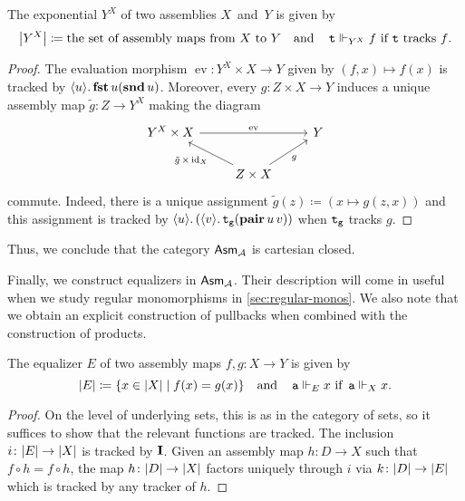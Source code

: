 \begin{proposition}[Exponentials]
  The exponential \(Y^X\) of two assemblies \(X\)~and~\(Y\) is given by
  \[
    \carrier*{Y^X} \coloneq
    \text{the set of assembly maps from \(X\) to \(Y\)}
    \quad\text{and}\quad
    \pca{t} \realizes_{Y^X} f
    \text{ if \(\pca{t}\) tracks \(f\)}.
  \]
\end{proposition}
\begin{proof}
  The evaluation morphism \(\operatorname{ev} \colon Y^X \times X \to Y\) given
  by \((f,x) \mapsto f(x)\) is tracked by
  \(\lambdapca{u}{\pcafst u(\pcasnd u)}\).
  Moreover, every \(g \colon Z \times X \to Y\) induces a unique assembly map
  \(\tilde g \colon Z \to Y^X\) making the diagram
  \[
    \begin{tikzcd}
      Y^X \times X \ar[rr,"\operatorname{ev}"]
      & & Y \\
      & Z \times X \ar[ur,"g"']
      \ar[ul,"{\tilde g} \,\times\, {\id_X}"]
    \end{tikzcd}
  \]
  commute.
  Indeed, there is a unique assignment
  \(\tilde g(z) \coloneq (x \mapsto g(z,x))\) and this assignment is tracked by
  \(\lambdapca{u}{(\lambdapca{v}{\pca{t_g}(\pcapair u\,v)})}\) when
  \(\pca{t_g}\) tracks \(g\).
\end{proof}

Thus, we conclude that the category \(\Asm{\AA}\) is cartesian closed.

Finally, we construct equalizers in \(\Asm{\AA}\). Their description will come
in useful when we study regular monomorphisms in \cref{sec:regular-monos}. We
also note that we obtain an explicit construction of pullbacks when combined
with the construction of products.

\begin{proposition}[Equalizers]
  The equalizer \(E\) of two assembly maps \(f,g \colon X \to Y\) is given by
  \[
    \carrier{E} \coloneq \set{x \in \carrier{X} \mid f(x) = g(x)}
    \quad\text{and}\quad
    \pca{a} \realizes_E x \text{ if } \pca{a} \realizes_X x.
  \]
\end{proposition}
\begin{proof}
  On the level of underlying sets, this is as in the category of sets, so it
  suffices to show that the relevant functions are tracked.
  The inclusion \(i \colon \carrier{E} \to \carrier{X}\) is tracked by
  \(\icomb\).
  Given an assembly map \(h \colon D \to X\) such that
  \(f \circ h = f \circ h\), the map \(h \colon \carrier{D} \to \carrier{X}\)
  factors uniquely through \(i\) via \(k \colon \carrier{D} \to \carrier{E}\)
  which is tracked by any tracker of \(h\).
\end{proof}

